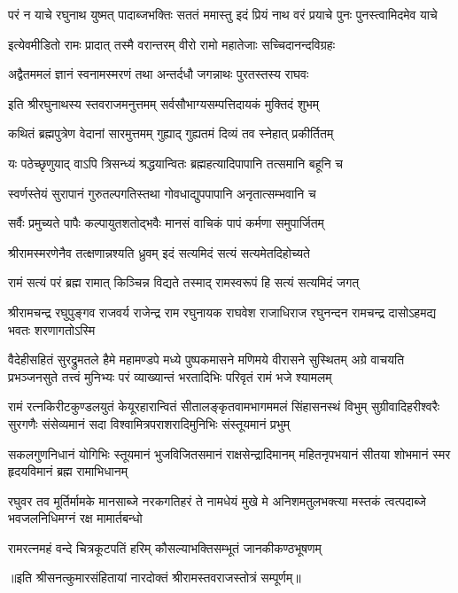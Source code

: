 \fourlineindentedshloka
{परं न याचे रघुनाथ युष्मत्}
{पादाब्जभक्तिः सततं ममास्तु}
{इदं प्रियं नाथ वरं प्रयाचे}
{पुनः पुनस्त्वामिदमेव याचे}%


\twolineshloka
{इत्येवमीडितो रामः प्रादात् तस्मै वरान्तरम्}
{वीरो रामो महातेजाः सच्चिदानन्दविग्रहः}%

\twolineshloka
{अद्वैतममलं ज्ञानं स्वनामस्मरणं तथा}
{अन्तर्दधौ जगन्नाथः पुरतस्तस्य राघवः}%

\twolineshloka
{इति श्रीरघुनाथस्य स्तवराजमनुत्तमम्}
{सर्वसौभाग्यसम्पत्तिदायकं मुक्तिदं शुभम्}%

\twolineshloka
{कथितं ब्रह्मपुत्रेण वेदानां सारमुत्तमम्}
{गुह्याद् गुह्यतमं दिव्यं तव स्नेहात् प्रकीर्तितम्}%

\twolineshloka
{यः पठेच्छृणुयाद् वाऽपि त्रिसन्ध्यं श्रद्धयान्वितः}
{ब्रह्महत्यादिपापानि तत्समानि बहूनि च}%

\twolineshloka
{स्वर्णस्तेयं सुरापानं गुरुतल्पगतिस्तथा}
{गोवधाद्युपपापानि अनृतात्सम्भवानि च}%

\twolineshloka
{सर्वैः प्रमुच्यते पापैः कल्पायुतशतोद्भवैः}
{मानसं वाचिकं पापं कर्मणा समुपार्जितम्}%

\twolineshloka
{श्रीरामस्मरणेनैव तत्क्षणान्नश्यति ध्रुवम्}
{इदं सत्यमिदं सत्यं सत्यमेतदिहोच्यते}%

\twolineshloka
{रामं सत्यं परं ब्रह्म रामात् किञ्चिन्न विद्यते}
{तस्माद् रामस्वरूपं हि सत्यं सत्यमिदं जगत्}%

\fourlineindentedshloka
{श्रीरामचन्द्र रघुपुङ्गव राजवर्य}
{राजेन्द्र राम रघुनायक राघवेश}
{राजाधिराज रघुनन्दन रामचन्द्र}
{दासोऽहमद्य भवतः शरणागतोऽस्मि}%

\fourlineindentedshloka
{वैदेहीसहितं सुरद्रुमतले हैमे महामण्डपे}
{मध्ये पुष्पकमासने मणिमये वीरासने सुस्थितम्}
{अग्रे वाचयति प्रभञ्जनसुते तत्त्वं मुनिभ्यः परं}
{व्याख्यान्तं भरतादिभिः परिवृतं रामं भजे श्यामलम्}%

\fourlineindentedshloka
{रामं रत्नकिरीटकुण्डलयुतं केयूरहारान्वितं}
{सीतालङ्कृतवामभागममलं सिंहासनस्थं विभुम्}
{सुग्रीवादिहरीश्वरैः सुरगणैः संसेव्यमानं सदा}
{विश्वामित्रपराशरादिमुनिभिः संस्तूयमानं प्रभुम्}%

\fourlineindentedshloka
{सकलगुणनिधानं योगिभिः स्तूयमानं}
{भुजविजितसमानं राक्षसेन्द्रादिमानम्}
{महितनृपभयानं सीतया शोभमानं}
{स्मर हृदयविमानं ब्रह्म रामाभिधानम्}%

\fourlineindentedshloka
{रघुवर तव मूर्तिर्मामके मानसाब्जे}
{नरकगतिहरं ते नामधेयं मुखे मे}
{अनिशमतुलभक्त्या मस्तकं त्वत्पदाब्जे}
{भवजलनिधिमग्नं रक्ष मामार्तबन्धो}%

\twolineshloka
{रामरत्नमहं वन्दे चित्रकूटपतिं हरिम्}
{कौसल्याभक्तिसम्भूतं जानकीकण्ठभूषणम्}%

॥इति श्रीसनत्कुमारसंहितायां नारदोक्तं श्रीरामस्तवराजस्तोत्रं सम्पूर्णम्॥